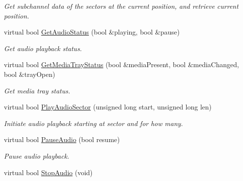 \begin{DoxyCompactItemize}
\begin{DoxyCompactList}\small\item\em Get subchannel data of the sectors at the current position, and retrieve current position. \end{DoxyCompactList}\item 
\hypertarget{classCDROM__Interface__SDL_aa26e937e9cb11094b9a75360462999c6}{virtual bool \hyperlink{classCDROM__Interface__SDL_aa26e937e9cb11094b9a75360462999c6}{Get\-Audio\-Status} (bool \&playing, bool \&pause)}\label{classCDROM__Interface__SDL_aa26e937e9cb11094b9a75360462999c6}

\begin{DoxyCompactList}\small\item\em Get audio playback status. \end{DoxyCompactList}\item 
\hypertarget{classCDROM__Interface__SDL_aff975ea549d6b3d650678c4d91b6ad22}{virtual bool \hyperlink{classCDROM__Interface__SDL_aff975ea549d6b3d650678c4d91b6ad22}{Get\-Media\-Tray\-Status} (bool \&media\-Present, bool \&media\-Changed, bool \&tray\-Open)}\label{classCDROM__Interface__SDL_aff975ea549d6b3d650678c4d91b6ad22}

\begin{DoxyCompactList}\small\item\em Get media tray status. \end{DoxyCompactList}\item 
\hypertarget{classCDROM__Interface__SDL_a1ab19753917b3fd97a28cec1191d84aa}{virtual bool \hyperlink{classCDROM__Interface__SDL_a1ab19753917b3fd97a28cec1191d84aa}{Play\-Audio\-Sector} (unsigned long start, unsigned long len)}\label{classCDROM__Interface__SDL_a1ab19753917b3fd97a28cec1191d84aa}

\begin{DoxyCompactList}\small\item\em Initiate audio playback starting at sector and for how many. \end{DoxyCompactList}\item 
\hypertarget{classCDROM__Interface__SDL_a05e05542290e98ba8dc41fb3fc75f363}{virtual bool \hyperlink{classCDROM__Interface__SDL_a05e05542290e98ba8dc41fb3fc75f363}{Pause\-Audio} (bool resume)}\label{classCDROM__Interface__SDL_a05e05542290e98ba8dc41fb3fc75f363}

\begin{DoxyCompactList}\small\item\em Pause audio playback. \end{DoxyCompactList}\item 
\hypertarget{classCDROM__Interface__SDL_ad6d548854bf1bac17204f67b8f1dbe40}{virtual bool \hyperlink{classCDROM__Interface__SDL_ad6d548854bf1bac17204f67b8f1dbe40}{Stop\-Audio} (void)}\label{classCDROM__Interface__SDL_ad6d548854bf1bac17204f67b8f1dbe40}


\end{DoxyCompactItemize}
